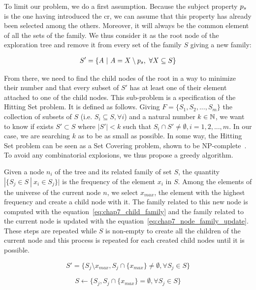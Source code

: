 To limit our problem, we do a first assumption. Because the subject property $p_s$ is the one having introduced the \acrshort{cr}, we can assume that this property has already been selected among the others. Moreover, it will always be the common element of all the sets of the family. We thus consider it as the root node of the exploration tree and remove it from every set of the family $S$ giving a new family:

\begin{align*}
S' = \{A\ |\ A = X \setminus p_s,\ \forall X \subseteq S\}
\end{align*}

From there, we need to find the child nodes of the root in a way to minimize their number and that every subset of $S'$ has at least one of their element attached to one of the child nodes. This sub-problem is a specification of the Hitting Set problem. It is defined as follows. Giving $F = \{S_1,S_2,...,S_m\}$ the collection of subsets of $S$ (i.e. $S_i \subseteq S, \forall i$) and a natural number $k \in \mathbb{N}$, we want to know if exists $S' \subset S$ where $|S'| < k$ such that $S_i \cap S' \neq \emptyset, i = 1,2,...,m$. In our case, we are searching $k$ as to be as small as possible. In some way, the Hitting Set problem can be seen as a Set Covering problem, shown to be NP-complete~\cite{karp_1972_reducibility}. To avoid any combinatorial explosions, we thus propose a greedy algorithm.

Given a node $n_i$ of the tree and its related family of set $S$, the quantity $|\{S_j \in S ~|~ x_i \in S_j \}|$ is the frequency of the element $x_i$ in $S$. Among the elements of the universe of the current node $n$, we select $x_{max}$, the element with the highest frequency and create a child node with it. The family related to this new node is computed with the equation~\eqref{eq:chap7_child_family} and the family related to the current node is updated with the equation~\eqref{eq:chap7_node_family_update}. These steps are repeated while $S$ is non-empty to create all the children of the current node and this process is repeated for each created child nodes until it is possible.

\begin{equation}
S' = \{S_j \setminus x_{max}, S_j \cap \{x_{max}\} \neq \emptyset, \forall S_j \in S\}
\label{eq:chap7_child_family}
\end{equation}

\begin{equation}
S \leftarrow \{S_j, S_j \cap \{x_{max}\} = \emptyset, \forall S_j \in S\}
\label{eq:chap7_node_family_update}
\end{equation}

